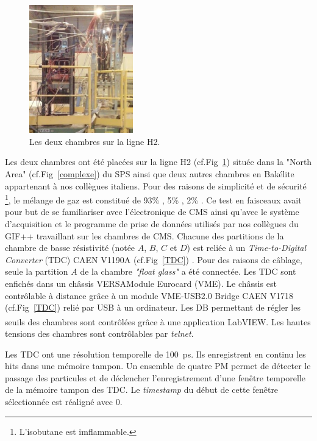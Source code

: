\begin{figure}
	\vspace{-0.1cm}
	\centering
	\includegraphics[width=0.40\textwidth]{GLA/GCH2.png}
	\caption{Les deux chambres sur la ligne H2.}
	\label{GCH2}
\end{figure}
Les deux chambres ont été placées sur la ligne H2 (cf.Fig~\ref{GCH2}) située dans la "North Area" (cf.Fig~\ref{complexe}) du SPS ainsi que deux autres chambres en Bakélite appartenant à nos collègues italiens. Pour des raisons de simplicité et de sécurité \footnote{L'isobutane est imflammable.}, le mélange de gaz est constitué de 93\% , 5\% , 2\% . Ce test en faisceaux avait pour but de se familiariser avec l'électronique de CMS ainsi qu'avec le système d'acquisition et le programme de prise de données utilisés par nos collègues du GIF++ travaillant sur les chambres de CMS. 
Chacune des partitions de la chambre de basse résistivité (notée $A$, $B$, $C$ et $D$) est reliée à un \textit{Time-to-Digital Converter} (TDC) CAEN V1190A (cf.Fig~\ref{TDC}) \cite{TDC}. Pour des raisons de câblage, seule la partition $A$ de la chambre \textit{"float glass"} a été connectée. Les TDC sont enfichés dans un châssis VERSAModule Eurocard (VME). Le châssis est contrôlable à distance grâce à un module VME-USB2.0 Bridge CAEN V1718 (cf.Fig~\ref{TDC}) \cite{VME} relié par USB à un ordinateur. Les DB permettant de régler les seuils des chambres sont contrôlées grâce à une application LabVIEW\textsuperscript{\textregistered}. Les hautes tensions des chambres sont contrôlables par \textit{telnet}. 

Les TDC ont une résolution temporelle de \SI{100}{\pico\second}. Ils enregistrent en continu les hits dans une mémoire tampon. Un ensemble de quatre PM permet de détecter le passage des particules et de déclencher l'enregistrement d'une fenêtre temporelle de la mémoire tampon des TDC. Le \textit{timestamp} du début de cette fenêtre sélectionnée est réaligné avec $0$.

